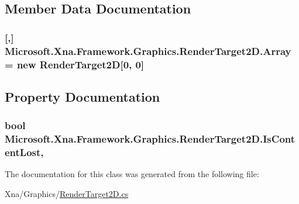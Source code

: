 \subsection{Member Data Documentation}
\hypertarget{class_microsoft_1_1_xna_1_1_framework_1_1_graphics_1_1_render_target2_d_a6779dd0823b468678b857afa840f7efc}{}
\subsubsection[{Array}]{ \mbox{[},\mbox{]} Microsoft.\+Xna.\+Framework.\+Graphics.\+Render\+Target2\+D.\+Array = new {\bf Render\+Target2\+D}\mbox{[}0, 0\mbox{]}\hspace{0.3cm}{\ttfamily [static]}}\label{class_microsoft_1_1_xna_1_1_framework_1_1_graphics_1_1_render_target2_d_a6779dd0823b468678b857afa840f7efc}


\subsection{Property Documentation}
\hypertarget{class_microsoft_1_1_xna_1_1_framework_1_1_graphics_1_1_render_target2_d_a9573e18c76f87589a4f7261ff3ed35d9}{}
\subsubsection[{Is\+Content\+Lost}]{\setlength{\rightskip}{0pt plus 5cm}bool Microsoft.\+Xna.\+Framework.\+Graphics.\+Render\+Target2\+D.\+Is\+Content\+Lost\hspace{0.3cm}{\ttfamily [get]}, {\ttfamily [set]}}\label{class_microsoft_1_1_xna_1_1_framework_1_1_graphics_1_1_render_target2_d_a9573e18c76f87589a4f7261ff3ed35d9}


The documentation for this class was generated from the following file\+:\begin{DoxyCompactItemize}
\item 
Xna/\+Graphics/\hyperlink{_render_target2_d_8cs}{Render\+Target2\+D.\+cs}\end{DoxyCompactItemize}

